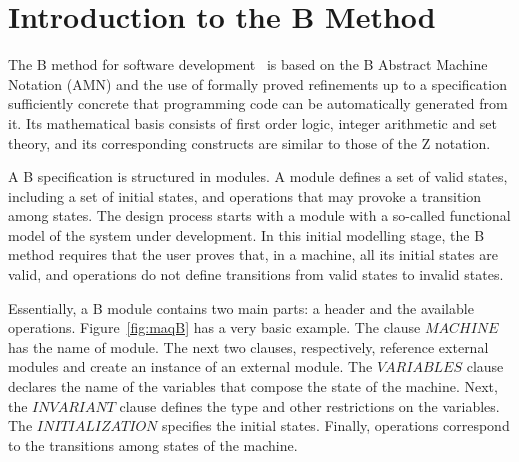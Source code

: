 \documentclass[11pt]{article} %
\begin{document}
\section{Introduction to the B Method}
\label{sec:B_method}

The B method for software development~\cite{Abrial} is based on the B Abstract
Machine Notation (AMN) and the use of formally proved refinements up to a
specification sufficiently concrete that programming code can be automatically
generated from it. Its mathematical basis consists of first order logic, integer
arithmetic and set theory, and its corresponding constructs are similar to those
of the Z notation.

A B specification is structured in modules. A module defines a set of valid
states, including a set of initial states, and operations that may provoke a
transition among states. The design process starts with a module with a
so-called functional model of the system under development. In this initial
modelling stage, the B method requires that the user proves that, in a machine,
all its initial states are valid, and operations do not define
transitions from valid states to invalid states.
  
Essentially, a B module contains two main parts: a header and the available
operations. Figure~\ref{fig:maqB} has a very basic example. The clause
$\mathit{MACHINE}$ has the name of module.  The next two clauses, respectively,
reference external modules and create an instance of an external module. The
$\mathit{VARIABLES}$ clause declares the name of the variables that compose the
state of the machine. Next, the $\mathit{INVARIANT}$ clause defines the type and
other restrictions on the variables. The $\mathit{INITIALIZATION} $ specifies
the initial states. Finally, operations correspond to the transitions among
states of the machine.
\end{document}
